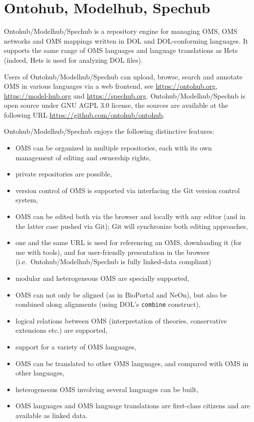 \documentclass[10pt,fleqn,%
\ifpretendfinal
final%
\else
draft%
\fi,
]{scrreprt}
\newcommand*{\syntax}[1]{\texttt{#1}}
\newcommand{\sclause}[1]{\section{#1}}
\begin{document}
\sclause{Ontohub, Modelhub, Spechub}\label{a:ontohub}

Ontohub/Modelhub/Spechub is a repository engine for managing 
OMS, OMS networks and OMS mappings written in DOL and DOL-conforming
languages.  It supports the same range of OMS languages and language
translations as Hets (indeed, Hets is used for analyzing DOL files).

Users of Ontohub/Modelhub/Spechub can upload, browse, search and annotate 
OMS in various languages via a web frontend, 
see \url{https://ontohub.org}, \url{https://model-hub.org} and \url{https://spechub.org}.
Ontohub/Modelhub/Spechub is open source under GNU AGPL 3.0 license,  the sources are available at the following URL 
\url{https://github.com/ontohub/ontohub}.

Ontohub/Modelhub/Spechub enjoys the following distinctive features:
\begin{itemize}
  \item OMS can be organized in multiple repositories, each
     with its own management of editing and ownership rights,
  \item private repositories are possible,
  \item version control of OMS is supported via interfacing
   the Git version control system,
  \item OMS can be edited both via the browser and locally with any
  editor (and in the latter case pushed via Git); Git will synchronize both editing approaches,
  \item one and the same URL is used for referencing an OMS, downloading
     it (for use with tools), and for user-friendly presentation in
     the browser (i.e.\ Ontohub/Modelhub/Spechub is fully linked-data compliant)
  \item modular and heterogeneous OMS are specially supported,
  \item OMS can not only be aligned (as in BioPortal and NeOn), but also be combined along alignments (using DOL's \syntax{combine} construct),
  \item logical relations between OMS (interpretation of theories, conservative
  extensions etc.) are supported,
  \item support for a variety of OMS languages, 
  \item OMS can be translated to other OMS languages, and compared with
   OMS in other languages,
  \item heterogeneous OMS involving several languages can be built,
  \item OMS languages and OMS language translations are first-class
   citizens and are available as linked data.
\end{itemize}
\end{document}
